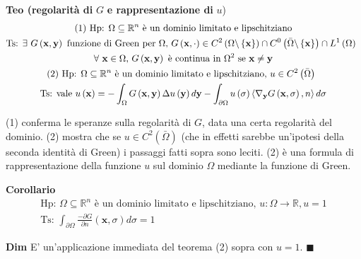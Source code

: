 \documentclass{article}
\begin{document}
\textbf{Teo (regolarit\`{a} di }$G$ \textbf{e rappresentazione di }$u$)%
\textbf{\ } 
\begin{gather*}
\text{(1) Hp: }\Omega \subseteq 
\mathbb{R}
^{n}\text{ \`{e} un dominio limitato e lipschitziano} \\
\text{Ts: }\exists \text{ }G\left( \mathbf{x,y}\right) \text{ funzione di
Green per }\Omega \text{, }G\left( \mathbf{x},\cdot \right) \in C^{2}\left(
\Omega \backslash \left\{ \mathbf{x}\right\} \right) \cap C^{0}\left( \bar{%
\Omega}\backslash \left\{ \mathbf{x}\right\} \right) \cap L^{1}\left( \Omega
\right) \text{ } \\
\forall \text{ }\mathbf{x}\in \Omega \text{, }G\left( \mathbf{x,y}\right) 
\text{ \`{e} continua in }\Omega ^{2}\text{ se }\mathbf{x\neq y} \\
\text{(2) Hp: }\Omega \subseteq 
\mathbb{R}
^{n}\text{ \`{e} un dominio limitato e lipschitziano, }u\in C^{2}\left( \bar{%
\Omega}\right) \text{ } \\
\text{Ts: vale }u\left( \mathbf{x}\right) =-\int_{\Omega }G\left( \mathbf{x,y%
}\right) \Delta u\left( \mathbf{y}\right) d\mathbf{y}-\int_{\partial \Omega
}u\left( \sigma \right) \left\langle \nabla _{\mathbf{y}}G\left( \mathbf{x}%
,\sigma \right) ,n\right\rangle d\sigma
\end{gather*}

(1) conferma le speranze sulla regolarit\`{a} di $G$, data una certa
regolarit\`{a} del dominio. (2) mostra che se $u\in C^{2}\left( \bar{\Omega}%
\right) $ (che in effetti sarebbe un'ipotesi della seconda identit\`{a} di
Green) i passaggi fatti sopra sono leciti. (2) \`{e} una formula di
rappresentazione della funzione $u$ sul dominio $\Omega $ mediante la
funzione di Green.

\textbf{Corollario}%
\begin{gather*}
\text{Hp: }\Omega \subseteq 
\mathbb{R}
^{n}\text{ \`{e} un dominio limitato e lipschitziano, }u:\Omega \rightarrow 
\mathbb{R}
,u=1 \\
\text{Ts: }\int_{\partial \Omega }\frac{-\partial G}{\partial n}\left( 
\mathbf{x},\sigma \right) d\sigma =1
\end{gather*}

\textbf{Dim} E' un'applicazione immediata del teorema (2) sopra con $u=1$. $%
\blacksquare $
\end{document}
